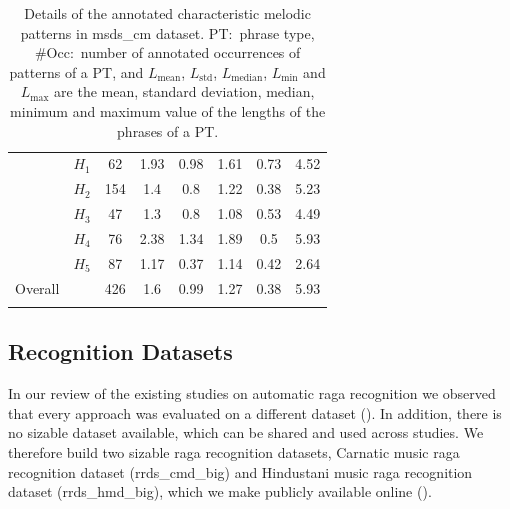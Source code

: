 {{{{\begin{table}
\begin{centering}
\begin{tabular}{ c c|c c c c c c}
				\tabletop		 
				\multirow{5}{*}{\acrshort{msds_cm_hmd}} 
				&  $H_1$& 62	&	1.93 & 0.98	&	1.61 &	0.73	&	4.52\\
				& $H_2$ & 154 	& 	1.4  & 0.8 	& 	1.22 & 	0.38 	& 5.23 \\
				& $H_3$ & 47  	& 	1.3  & 0.8 	& 	1.08 & 	0.53 	& 4.49\\
				& $H_4$ & 76  	& 	2.38 & 1.34	& 	1.89 &	0.5  	& 5.93\\
				& $H_5$ & 87  	& 	1.17 & 0.37	& 	1.14 & 	0.42 	& 2.64\\
				
				\tablemid
				Overall	&  	& 426 & 1.6 & 0.99& 1.27 & 0.38 & 5.93\\
				
				\tablebot
			\end{tabular}
			\caption[Details of the annotated characteristic melodic patterns in \acrshort{msds_cm} dataset.]{Details of the annotated characteristic melodic patterns in \acrshort{msds_cm} dataset. PT:~phrase type, \#Occ:~number of annotated occurrences of  patterns of a PT, and $L_{\mathrm{mean}}$, $L_{\mathrm{std}}$, $L_{\mathrm{median}}$, $L_{\mathrm{min}}$ and $L_{\mathrm{max}}$ are the mean, standard deviation, median, minimum and maximum value of the lengths of the phrases of a PT.} 
			\label{tab:categorywise_details_revised_melodic_similarity_dataset}
			\par \end{centering}
	\end{table}
		
\subsection{ Recognition Datasets}
\label{sec:corpus_raga_recognition_datasets}

In our review of the existing studies on automatic \gls{raga} recognition we observed that every approach was evaluated on a different dataset (). In addition, there is no sizable dataset available, which can be shared and used across studies. We therefore build two sizable \gls{raga} recognition datasets, Carnatic music \gls{raga} recognition dataset (\acrshort{rrds_cmd_big}) and Hindustani music \gls{raga} recognition dataset (\acrshort{rrds_hmd_big}), which we make publicly available online ().

}}}}
